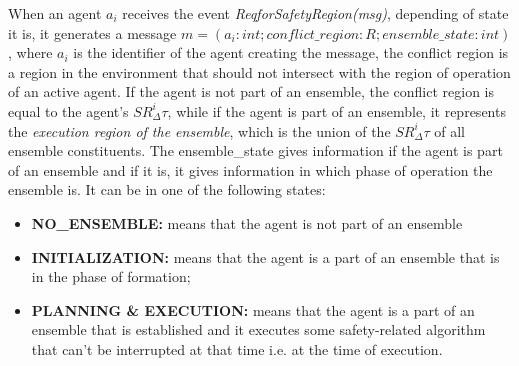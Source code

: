 \documentclass[journal]{IEEEtran}
\theoremstyle{definition}
\begin{document}
When an agent $a_i$ receives the event \textit{ReqforSafetyRegion(msg)}, depending of state it is, it generates a message  $m=(a_i:int;  conflict\_region:R; ensemble\_state:int)$, where \textit{$a_i$} is the identifier of the agent creating the message, the conflict region is a region in the environment that should not intersect with the region of operation of an active agent. If the agent is not part of an ensemble, the conflict region is equal to the agent's $SR^i_\Delta\tau$, while if the agent is part of an ensemble, it represents the \textit{execution region of the ensemble}, which is the union of the
$SR^i_\Delta\tau$ of all ensemble constituents. The ensemble\_state gives information if the agent is part of an ensemble and if it is, it gives information in which phase of operation the ensemble is. It can be in one of the following states: 
\begin{itemize}
\item \textbf{NO\_ENSEMBLE:} means that the agent is not part of an ensemble
\item \textbf{INITIALIZATION:}  means that the agent is a part of an ensemble that is in the phase of formation;
\item \textbf{PLANNING \& EXECUTION:}
means that the agent is a part of an ensemble that is established and it executes some safety-related algorithm that can't be interrupted at that time i.e. at the time of execution.
\end{itemize}
\end{document}
